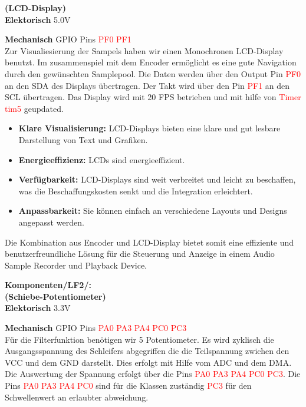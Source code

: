 \textbf{(LCD-Display)} \\

\textbf{Elektorisch} 5.0V

\textbf{Mechanisch} GPIO Pins  \textcolor{red}{PF0 PF1} \\

Zur Visualiesierung der Sampels haben wir einen Monochronen LCD-Display benutzt. Im zusammenspiel mit dem Encoder ermöglicht es eine gute Navigation durch den gewünschten Samplepool. Die Daten werden über den Output Pin  \textcolor{red}{PF0} an den SDA des Displays übertragen. Der Takt wird über den Pin  \textcolor{red}{PF1} an den SCL übertragen. Das Display wird mit 20 FPS betrieben und mit hilfe von \textcolor{red}{Timer tim5} geupdated.

\begin{itemize}
    \item \textbf{Klare Visualisierung:} LCD-Displays bieten eine klare und gut lesbare Darstellung von Text und Grafiken.
    
    \item \textbf{Energieeffizienz:} LCDs sind energieeffizient.
    
    \item \textbf{Verfügbarkeit:} LCD-Displays sind weit verbreitet und leicht zu beschaffen, was die Beschaffungskosten senkt und die Integration erleichtert.
    
    \item \textbf{Anpassbarkeit:} Sie können einfach an verschiedene Layouts und Designs angepasst werden.
\end{itemize}


Die Kombination aus Encoder und LCD-Display bietet somit eine effiziente und benutzerfreundliche Lösung für die Steuerung und Anzeige in einem Audio Sample Recorder und Playback Device.

\newpage
\textbf{Komponenten/LF2/:}\\

\textbf{(Schiebe-Potentiometer)}\\

\textbf{Elektorisch} 3.3V

\textbf{Mechanisch} GPIO Pins  \textcolor{red}{PA0 PA3 PA4 PC0 PC3} \\

Für die Filterfunktion benötigen wir 5 Potentiometer. Es wird zyklisch die Ausgangsspannung des Schleifers abgegriffen die die Teilspannung zwichen den VCC und dem GND darstellt. Dies erfolgt mit Hilfe vom ADC und dem DMA. Die Auswertung der Spannung erfolgt über die Pins  \textcolor{red}{PA0 PA3 PA4 PC0 PC3}. Die Pins  \textcolor{red}{PA0 PA3 PA4 PC0} sind für die Klassen zuständig  \textcolor{red}{PC3} für den Schwellenwert an erlaubter abweichung.

